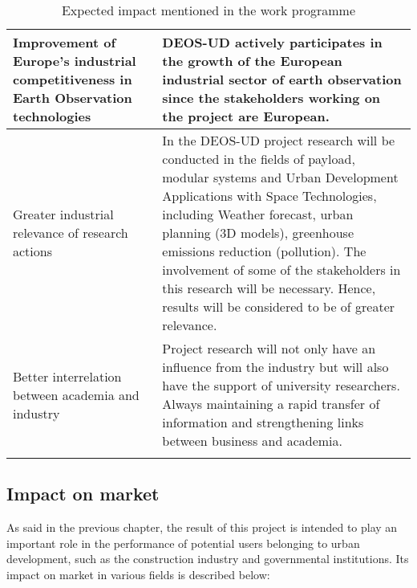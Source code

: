 \begin{longtable}{p{3cm} p{11cm}}
	\midrule
	
	Improvement of Europe’s industrial competitiveness in Earth Observation technologies & DEOS-UD actively participates in the growth of the European industrial sector of earth observation since the stakeholders working on the project are European.\vspace{0.2cm}\\
	
	\midrule
	
	Greater industrial relevance of research actions & In the DEOS-UD project research will be conducted in the fields of payload, modular systems and Urban Development Applications with Space Technologies, including Weather forecast, urban planning (3D models), greenhouse emissions reduction (pollution). The involvement of some of the stakeholders in this research will be necessary. Hence, results will be considered to be of greater relevance.\vspace{0.2cm}\\
	
	\midrule
	
	Better interrelation between academia and industry & Project research will not only have an influence from the industry but will also have the support of university researchers. Always maintaining a rapid transfer of information and strengthening links between business and academia.\vspace{0.2cm}\\
	
	
	\bottomrule[2pt]
	
	
	\caption{Expected impact mentioned in the work programme}
\end{longtable}

\subsection{Impact on market}

As said in the previous chapter, the result of this project is intended to play an important role in the performance of potential users belonging to urban development, such as the construction industry and governmental institutions. Its impact on market in various fields is described below:

